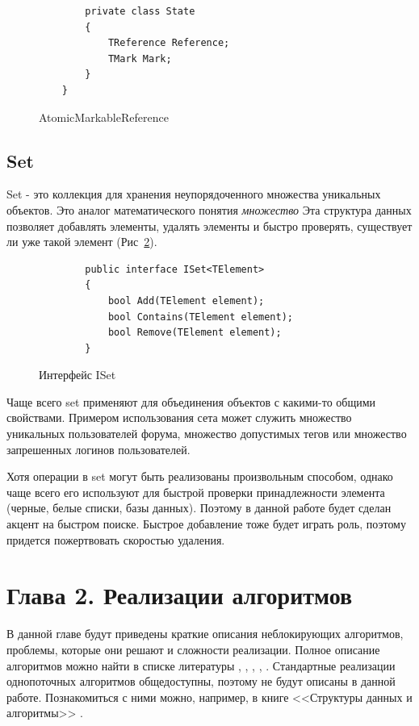 \documentclass[12pt]{article}
\begin{document}
{\begin{figure}[h]
\begin{lstlisting}
		private class State
		{
			TReference Reference;
			TMark Mark;
		}
	}
					\end{lstlisting}
					\caption{AtomicMarkableReference}
					\label{pic:AMR}
				\end{figure}	
			\subsection{Set}
				\par Set - это коллекция для хранения неупорядоченного множества уникальных объектов. Это аналог математического понятия \textit{множество} Эта структура данных позволяет добавлять элементы, удалять элементы и быстро проверять, существует ли уже такой элемент (Рис~\ref{pic:Set}). 
				\begin{figure}[h]
					\begin{lstlisting}
		public interface ISet<TElement>
		{
			bool Add(TElement element);
			bool Contains(TElement element);
			bool Remove(TElement element);
		}
					\end{lstlisting}
					\caption{Интерфейс ISet}
					\label{pic:Set}
				\end{figure}
				\par Чаще всего set применяют для объединения объектов с какими-то общими свойствами. Примером использования сета может служить множество уникальных пользователей форума, множество допустимых тегов или множество запрешенных логинов пользователей.  
				\par Хотя операции в set могут быть реализованы произвольным способом, однако чаще всего его используют для быстрой проверки принадлежности элемента (черные, белые списки, базы данных). Поэтому в данной работе будет сделан акцент на быстром поиске. Быстрое добавление тоже будет играть роль, поэтому придется пожертвовать скоростью удаления.
		\newpage
		
		\section{Глава 2. Реализации алгоритмов}
			\par В данной главе будут приведены краткие описания неблокирующих алгоритмов, проблемы, которые они решают и сложности реализации. Полное описание алгоритмов можно найти в списке литературы \cite{LinkedList}, \cite{ListSkipList}, \cite{ListAndSkipList}, \cite{HashTable}, \cite{artOfMultiprocessor}. Стандартные реализации однопоточных алгоритмов общедоступны, поэтому не будут описаны в данной работе. Познакомиться с ними можно, например, в книге <<Структуры данных и алгоритмы>> \cite{dataStructures}.
}
\end{document}
